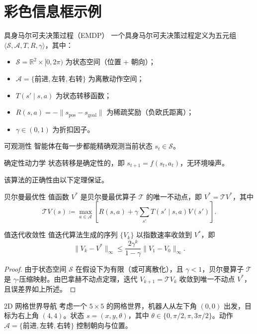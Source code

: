 \section{彩色信息框示例}

\begin{definition}{具身马尔可夫决策过程（EMDP）}{}
一个具身马尔可夫决策过程定义为五元组 $\langle \mathcal{S}, \mathcal{A}, T, R, \gamma \rangle$，其中：
\begin{itemize}[left=0pt]
  \item $\mathcal{S} = \mathbb{R}^2 \times [0, 2\pi)$ 为状态空间（位置 + 朝向）；
  \item $\mathcal{A} = \{\text{前进}, \text{左转}, \text{右转}\}$ 为离散动作空间；
  \item $T(s' \mid s, a)$ 为状态转移函数；
  \item $R(s, a) = -\| s_{\text{pos}} - s_{\text{goal}} \|$ 为稀疏奖励（负欧氏距离）；
  \item $\gamma \in (0,1)$ 为折扣因子。
\end{itemize}
\end{definition}

\begin{assumption}{可观测性}{}
智能体在每一步都能精确观测当前状态 $s_t \in \mathcal{S}$。
\end{assumption}

\begin{assumption}{确定性动力学}{}
状态转移是确定性的，即 $s_{t+1} = f(s_t, a_t)$，无环境噪声。
\end{assumption}

该算法的正确性由以下定理保证。

\begin{lemma}{贝尔曼最优性}{}
值函数 $V^*$ 是贝尔曼最优算子 $\mathcal{T}$ 的唯一不动点，即 $V^* = \mathcal{T} V^*$，其中
\[
\mathcal{T} V(s) \coloneqq \max_{a \in \mathcal{A}} \left[ R(s, a) + \gamma \sum_{s'} T(s' \mid s, a) V(s') \right].
\]
\end{lemma}

\begin{theorem}{值迭代收敛性}{}
值迭代算法生成的序列 $\{V_k\}$ 以指数速率收敛到 $V^*$，即
\[
\| V_k - V^* \|_\infty \leq \frac{2 \gamma^k}{1 - \gamma} \| V_1 - V_0 \|_\infty.
\]
\end{theorem}

\begin{proof}{}
由于状态空间 $\mathcal{S}$ 在假设下为有限（或可离散化），且 $\gamma < 1$，贝尔曼算子 $\mathcal{T}$ 是 $\gamma$-压缩映射。由巴拿赫不动点定理，迭代 $V_{k+1} = \mathcal{T} V_k$ 收敛到唯一不动点 $V^*$，且误差界如上所述。
\end{proof}

\begin{example}{2D 网格世界导航}{}
考虑一个 $5 \times 5$ 的网格世界，机器人从左下角 $(0,0)$ 出发，目标为右上角 $(4,4)$。状态 $s = (x, y, \theta)$，其中 $\theta \in \{0, \pi/2, \pi, 3\pi/2\}$。动作 $\mathcal{A} = \{\text{前进}, \text{左转}, \text{右转}\}$ 控制朝向与位置。
\end{example}

\newpage